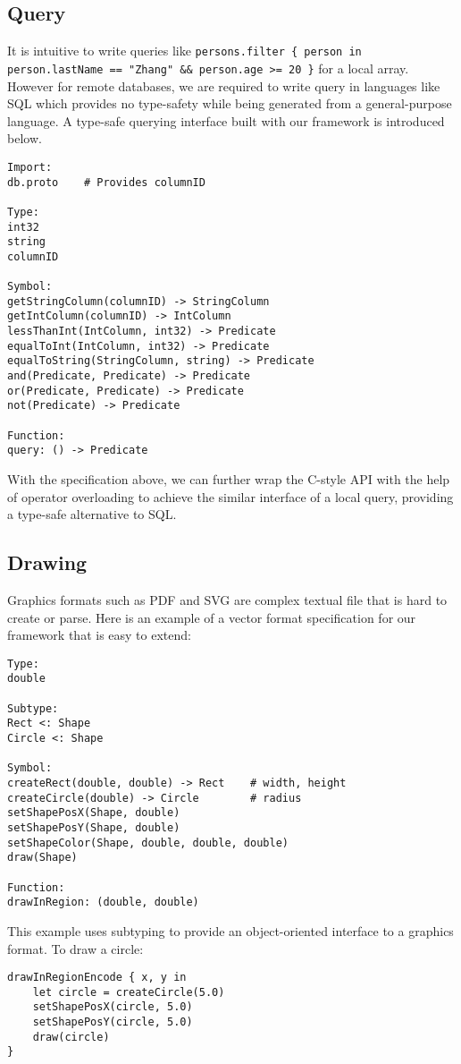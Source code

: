 \documentclass[12pt]{article}
\begin{document}
\subsection{Query}
It is intuitive to write queries like \texttt{persons.filter \{ person in person.lastName == "Zhang" \&\& person.age >= 20 \}} for a local array. However for remote databases, we are required to write query in languages like SQL which provides no type-safety while being generated from a general-purpose language. A type-safe querying interface built with our framework is introduced below.
\begin{lstlisting}
Import:
db.proto    # Provides columnID

Type:
int32
string
columnID

Symbol:
getStringColumn(columnID) -> StringColumn
getIntColumn(columnID) -> IntColumn
lessThanInt(IntColumn, int32) -> Predicate
equalToInt(IntColumn, int32) -> Predicate
equalToString(StringColumn, string) -> Predicate
and(Predicate, Predicate) -> Predicate
or(Predicate, Predicate) -> Predicate
not(Predicate) -> Predicate

Function:
query: () -> Predicate
\end{lstlisting}
With the specification above, we can further wrap the C-style API with the help of operator overloading to achieve the similar interface of a local query, providing a type-safe alternative to SQL.

\subsection{Drawing}
Graphics formats such as PDF and SVG are complex textual file that is hard to create or parse. Here is an example of a vector format specification for our framework that is easy to extend:
\begin{lstlisting}
Type:
double

Subtype:
Rect <: Shape
Circle <: Shape

Symbol:
createRect(double, double) -> Rect    # width, height
createCircle(double) -> Circle        # radius
setShapePosX(Shape, double)
setShapePosY(Shape, double)
setShapeColor(Shape, double, double, double)
draw(Shape)

Function:
drawInRegion: (double, double)
\end{lstlisting}
This example uses subtyping to provide an object-oriented interface to a graphics format. To draw a circle:
\begin{lstlisting}
drawInRegionEncode { x, y in
    let circle = createCircle(5.0)
    setShapePosX(circle, 5.0)
    setShapePosY(circle, 5.0)
    draw(circle)
}
\end{lstlisting}
\end{document}
